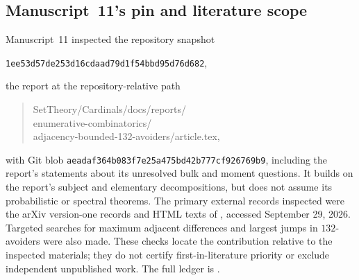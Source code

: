 \documentclass[11pt,a4paper]{article}
\theoremstyle{definition}\newaliascnt{definition}{theorem}
\theoremstyle{remark}\newaliascnt{remark}{theorem}
\begin{document}
\subsection{Manuscript~11's pin and literature scope}
Manuscript~11 inspected the repository snapshot
\begin{center}\small\texttt{1ee53d57de253d16cdaad79d1f54bbd95d76d682},\end{center}
the report at the repository-relative path
\begin{quote}\small\ttfamily
SetTheory/Cardinals/docs/reports/\\
enumerative-combinatorics/\\
adjacency-bounded-132-avoiders/article.tex,
\end{quote}
with Git blob \texttt{aeadaf364b083f7e25a475bd42b777cf926769b9}, including
the report's statements about its unresolved bulk and moment questions. It
builds on the report's subject and elementary decompositions, but does not
assume its probabilistic or spectral theorems. The primary external records
inspected were the arXiv version-one records and HTML texts of
\cite{Nadler,MayamaAkita}, accessed September 29, 2026. Targeted searches for
maximum adjacent differences and largest jumps in $132$-avoiders were also
made. These checks locate the contribution relative to the inspected
materials; they do not certify first-in-literature priority or exclude
independent unpublished work. The full ledger is
.
\end{document}
